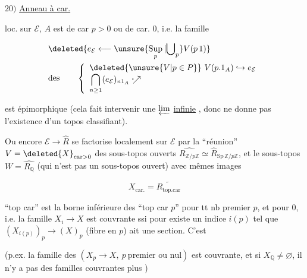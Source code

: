 

 $20)$ \uline{Anneau à car.}

loc. sur $\mathcal E$, $A$ est de car $p>0$ ou de car. $0$, i.e. la famille

\[
\begin{aligned}
 &\deleted{\ensuremath{e_{\mathcal E}\longleftarrow\unsure{\mathop{\mathrm{Sup}}\limits_p|{\bigcup}_p}V(p\,1)}}\\
 &\text{des}\qquad
 \left\{\begin{array}{l}
 \deleted{\ensuremath{\unsure{V|p\in P}}}\ V(p.1_A)\hookrightarrow e_{\mathcal E}\\
 \displaystyle\bigcap_{n\geq 1}(e_{\mathcal E})_{n1_A}\lhook\joinrel\nearrow
 \end{array}\right.
\end{aligned}
\]

est épimorphique (cela fait  intervenir une $\varprojlim$ \uline{infinie} \unsure{$\bigvee$|$\exists$}, donc ne donne pas l'existence d'un topos classifiant).

Ou encore $\mathcal E\to\widehat R$ se factorise localement sur $\mathcal E$ par la ``réunion'' $V=\deleted{\ensuremath{X}}_{\mathrm{car}>0}$ des sous-topos ouverts  $\widehat{R_{\mathbb Z/p\mathbb Z}}\simeq\widehat R_{\mathrm{Sp}\,\mathbb Z/p\mathbb Z}$, et le sous-topos $W=\widehat{R_{\mathbb Q}}$ (qui n'est pas un sous-topos ouvert) avec mêmes images 

\[
 X_{\mathrm{car}.}=\widetilde{R_{\mathrm{top.car}}}
\]

  ``top car'' est la borne inférieure des ``top car $p$'' pour tt nb premier $p$, et pour $0$, i.e. la famille $X_i\longrightarrow X$ est couvrante ssi pour    existe un indice $i(p)$ tel que $(X_{i(p)})_p\longrightarrow (X)_p$ (fibre en $p$) ait une section. C'est

(p.ex. la famille des $(X_p\to X,\ p\ \text{premier ou nul})$ est couvrante, et si $X_{\mathbb Q}\ne\varnothing$, il n'y a pas des familles couvrantes plus )

